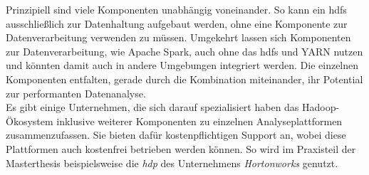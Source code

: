 \noindent
Prinzipiell sind viele Komponenten unabhängig voneinander. So kann ein \gls{hdfs} ausschließlich zur Datenhaltung aufgebaut werden, ohne eine Komponente zur Datenverarbeitung verwenden zu müssen. Umgekehrt lassen sich Komponenten zur Datenverarbeitung, wie Apache Spark, auch ohne das \gls{hdfs} und YARN nutzen und könnten damit auch in andere Umgebungen integriert werden. Die einzelnen Komponenten entfalten, gerade durch die Kombination miteinander, ihr Potential zur performanten Datenanalyse.\\

\noindent
Es gibt einige Unternehmen, die sich darauf spezialisiert haben das Hadoop-Ökosystem inklusive weiterer Komponenten zu einzelnen Analyseplattformen zusammenzufassen. Sie bieten dafür kostenpflichtigen Support an, wobei diese Plattformen auch kostenfrei betrieben werden können. So wird im Praxisteil der Masterthesis beispielsweise die \textit{\gls{hdp}} des Unternehmens \textit{Hortonworks} genutzt.


